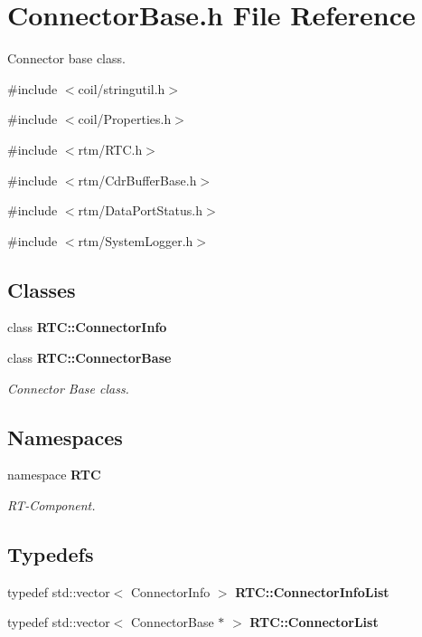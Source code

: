 \section{ConnectorBase.h File Reference}
\label{ConnectorBase_8h}


Connector base class.  


{\ttfamily \#include $<$coil/stringutil.h$>$}\par
{\ttfamily \#include $<$coil/Properties.h$>$}\par
{\ttfamily \#include $<$rtm/RTC.h$>$}\par
{\ttfamily \#include $<$rtm/CdrBufferBase.h$>$}\par
{\ttfamily \#include $<$rtm/DataPortStatus.h$>$}\par
{\ttfamily \#include $<$rtm/SystemLogger.h$>$}\par
\subsection*{Classes}
\begin{DoxyCompactItemize}
\item 
class {\bf RTC::ConnectorInfo}
\item 
class {\bf RTC::ConnectorBase}
\begin{DoxyCompactList}\small\item\em Connector Base class. \item\end{DoxyCompactList}\end{DoxyCompactItemize}
\subsection*{Namespaces}
\begin{DoxyCompactItemize}
\item 
namespace {\bf RTC}


\begin{DoxyCompactList}\small\item\em RT-\/Component. \item\end{DoxyCompactList}

\end{DoxyCompactItemize}
\subsection*{Typedefs}
\begin{DoxyCompactItemize}
\item 
typedef std::vector$<$ ConnectorInfo $>$ {\bf RTC::ConnectorInfoList}
\item 
typedef std::vector$<$ ConnectorBase $\ast$ $>$ {\bf RTC::ConnectorList}
\end{DoxyCompactItemize}


